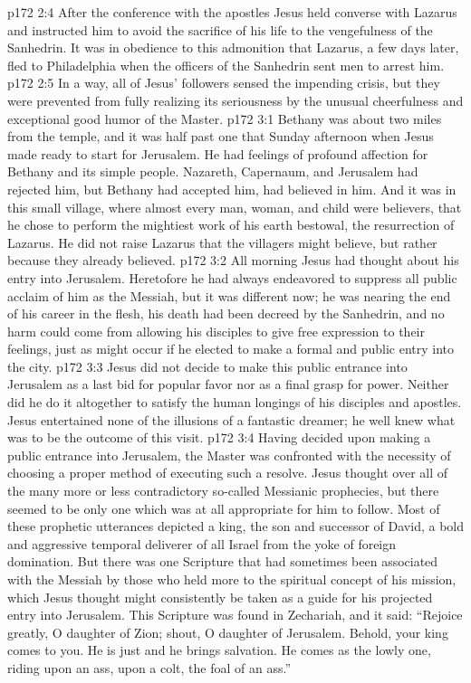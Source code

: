 \vs p172 2:4 After the conference with the apostles Jesus held converse with Lazarus and instructed him to avoid the sacrifice of his life to the vengefulness of the Sanhedrin. It was in obedience to this admonition that Lazarus, a few days later, fled to Philadelphia when the officers of the Sanhedrin sent men to arrest him.
\vs p172 2:5 In a way, all of Jesus’ followers sensed the impending crisis, but they were prevented from fully realizing its seriousness by the unusual cheerfulness and exceptional good humor of the Master.
\vs p172 3:1 Bethany was about two miles from the temple, and it was half past one that Sunday afternoon when Jesus made ready to start for Jerusalem. He had feelings of profound affection for Bethany and its simple people. Nazareth, Capernaum, and Jerusalem had rejected him, but Bethany had accepted him, had believed in him. And it was in this small village, where almost every man, woman, and child were believers, that he chose to perform the mightiest work of his earth bestowal, the resurrection of Lazarus. He did not raise Lazarus that the villagers might believe, but rather because they already believed.
\vs p172 3:2 All morning Jesus had thought about his entry into Jerusalem. Heretofore he had always endeavored to suppress all public acclaim of him as the Messiah, but it was different now; he was nearing the end of his career in the flesh, his death had been decreed by the Sanhedrin, and no harm could come from allowing his disciples to give free expression to their feelings, just as might occur if he elected to make a formal and public entry into the city.
\vs p172 3:3 Jesus did not decide to make this public entrance into Jerusalem as a last bid for popular favor nor as a final grasp for power. Neither did he do it altogether to satisfy the human longings of his disciples and apostles. Jesus entertained none of the illusions of a fantastic dreamer; he well knew what was to be the outcome of this visit.\plusone
\vs p172 3:4 Having decided upon making a public entrance into Jerusalem, the Master was confronted with the necessity of choosing a proper method of executing such a resolve. Jesus thought over all of the many more or less contradictory so\hyp{}called Messianic prophecies, but there seemed to be only one which was at all appropriate for him to follow. Most of these prophetic utterances depicted a king, the son and successor of David, a bold and aggressive temporal deliverer of all Israel from the yoke of foreign domination. But there was one Scripture that had sometimes been associated with the Messiah by those who held more to the spiritual concept of his mission, which Jesus thought might consistently be taken as a guide for his projected entry into Jerusalem. This Scripture was found in Zechariah, and it said: “Rejoice greatly, O daughter of Zion; shout, O daughter of Jerusalem. Behold, your king comes to you. He is just and he brings salvation. He comes as the lowly one, riding upon an ass, upon a colt, the foal of an ass.”
